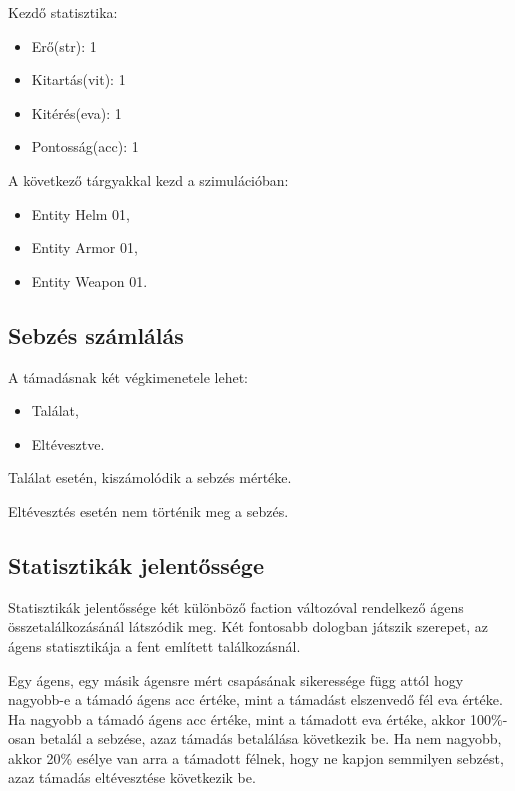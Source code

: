 \noindent Kezdő statisztika:
\begin{itemize}
    \item Erő(str): 1
    \item Kitartás(vit): 1
    \item Kitérés(eva): 1
    \item Pontosság(acc): 1
\end{itemize}

\noindent A következő tárgyakkal kezd a szimulációban:

\begin{itemize}
    \item Entity Helm 01,
    \item Entity Armor 01,
    \item Entity Weapon 01.
\end{itemize}

\subsection{Sebzés számlálás}

\label{számlálás}

A támadásnak két végkimenetele lehet:

\begin{itemize}
    \item Találat,
    \item Eltévesztve.
\end{itemize}

\noindent Találat esetén, kiszámolódik a sebzés mértéke. 

\noindent Eltévesztés esetén nem történik meg a sebzés. 

\subsection{Statisztikák jelentőssége}

Statisztikák jelentőssége két különböző faction változóval rendelkező ágens összetalálkozásánál látszódik meg.
Két fontosabb dologban játszik szerepet, az ágens statisztikája a fent említett találkozásnál.

Egy ágens, egy másik ágensre mért csapásának sikeressége függ attól hogy nagyobb-e a támadó ágens acc értéke, mint a támadást elszenvedő fél eva értéke.
Ha nagyobb a támadó ágens acc értéke, mint a támadott eva értéke, akkor 100\%-osan betalál a sebzése, azaz támadás betalálása következik be.
Ha nem nagyobb, akkor 20\% esélye van arra a támadott félnek, hogy ne kapjon semmilyen sebzést, azaz támadás eltévesztése következik be.

